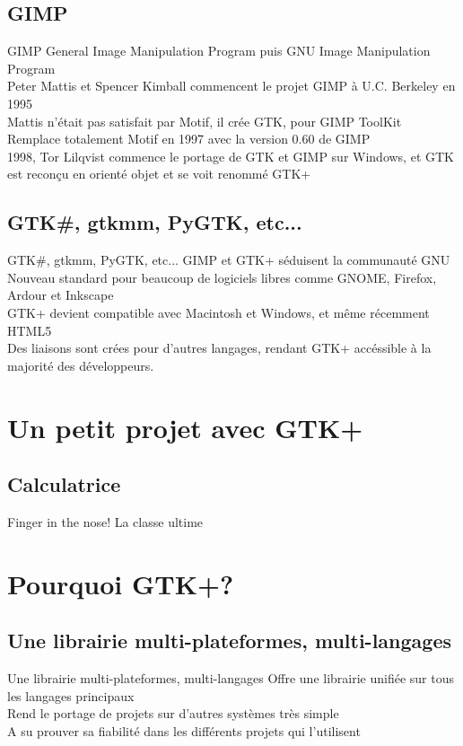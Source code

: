 \documentclass{beamer}
\begin{document}
  \subsection{GIMP}
  \begin{frame}{GIMP}
    General Image Manipulation Program puis GNU Image Manipulation Program\\
    Peter Mattis et Spencer Kimball commencent le projet GIMP à U.C. Berkeley en 1995\\
    Mattis n'était pas satisfait par Motif, il crée GTK, pour GIMP ToolKit\\
    Remplace totalement Motif en 1997 avec la version 0.60 de GIMP\\
    1998, Tor Lilqvist commence le portage de GTK et GIMP sur Windows, et GTK est reconçu en orienté objet et se voit renommé GTK+
  \end{frame}

  \subsection{GTK\#, gtkmm, PyGTK, etc...}
  \begin{frame}{GTK\#, gtkmm, PyGTK, etc...}
    GIMP et GTK+ séduisent la communauté GNU\\
    Nouveau standard pour beaucoup de logiciels libres comme GNOME, Firefox, Ardour et Inkscape\\
    GTK+ devient compatible avec Macintosh et Windows, et même récemment HTML5\\
    Des liaisons sont crées pour d'autres langages, rendant GTK+ accéssible à la majorité des développeurs.
  \end{frame}

  \section{Un petit projet avec GTK+}
  \subsection{Calculatrice}
  \begin{frame}{Finger in the nose!}
    La classe ultime
  \end{frame}


  \section{Pourquoi GTK+?}
  \subsection{Une librairie multi-plateformes, multi-langages}
  \begin{frame}{Une librairie multi-plateformes, multi-langages}
    Offre une librairie unifiée sur tous les langages principaux\\
    Rend le portage de projets sur d'autres systèmes très simple\\
    A su prouver sa fiabilité dans les différents projets qui l'utilisent
  \end{frame}
\end{document}
